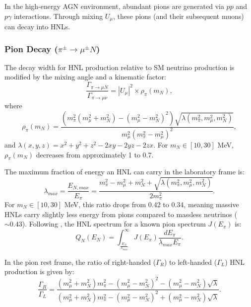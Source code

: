 \documentclass{article}
\newcommand{\mN}{m_N}
\newcommand{\mmu}{m_\mu}
\newcommand{\mpi}{m_\pi}
\begin{document}
In the high-energy AGN environment, abundant pions are generated via $pp$ and $p\gamma$ interactions. Through mixing $U_{\mu}$, these pions (and their subsequent muons) can decay into HNLs.

\subsubsection{Pion Decay ($\pi^\pm \to \mu^\pm N$)}

The decay width for HNL production relative to SM neutrino production is modified by the mixing angle and a kinematic factor:
\begin{equation}
  \frac{\Gamma_{\pi \to \mu N}}{\Gamma_{\pi \to \mu \nu}} = |U_{\mu}|^2 \times \rho_\pi (m_N), \label{eq:pion_HNL_rho}
\end{equation}
where
\begin{equation}
   \rho_\pi (m_N) = \frac{(\mpi^2 (\mmu^2 + \mN^2) - (\mmu^2 - \mN^2)^2) \sqrt{\lambda(\mpi^2, \mmu^2, \mN^2)}}{\mmu^2 (\mpi^2 - \mmu^2)^2}, \label{eq:rho_pi}
\end{equation}
and $\lambda(x, y, z) = x^2 + y^2 + z^2 - 2xy - 2yz - 2zx$. For $m_N \in [10, 30]$ MeV, $\rho_\pi(m_N)$ decreases from approximately 1 to 0.7.

The maximum fraction of energy an HNL can carry in the laboratory frame is:
\begin{equation}
  \lambda_{max} = \frac{E_{N,max}}{E_\pi} = \frac{\mpi^2 - \mmu^2 + \mN^2 + \sqrt{\lambda(\mpi^2, \mmu^2, \mN^2)}}{2 \mpi^2}.
\end{equation}
For $m_N \in [10, 30]$ MeV, this ratio drops from 0.42 to 0.34, meaning massive HNLs carry slightly less energy from pions compared to massless neutrinos ($\sim 0.43$). Following \cite{kelner2006energy}, the HNL spectrum for a known pion spectrum $J(E_\pi)$ is:
\begin{equation}
  Q_{N}(E_N) = \int_{\frac{E_N}{\lambda_{max}}}^{\infty} J(E_\pi) \frac{d E_\pi}{\lambda_{max} E_\pi}. \label{eq:hnl_spec_from_pion}
\end{equation}

In the pion rest frame, the ratio of right-handed ($\Gamma_R$) to left-handed ($\Gamma_L$) HNL production is given by:
\begin{equation}
  \frac{\Gamma_R}{\Gamma_L} = \frac{(\mmu^2 + \mN^2) \mpi^2 - (\mmu^2 - \mN^2)^2 - (\mmu^2 - \mN^2) \sqrt{\lambda}}
  {(\mmu^2 + \mN^2) \mpi^2 - (\mmu^2 - \mN^2)^2 + (\mmu^2 - \mN^2) \sqrt{\lambda}}. \label{eq:hnl_hel_pion}
\end{equation}
\end{document}
